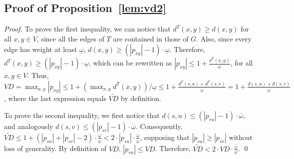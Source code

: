 \documentclass[english]{llncs}
\newcommand{\vd}{$\mathit{VD}$\xspace}
\newcommand{\vda}{$\tilde{\mathit{VD}}$\xspace}
\begin{document}
\subsection{Proof of Proposition~\ref{lem:vd2}}
\label{sub:proof_vd2}
\begin{proof}
To prove the first inequality, we can notice that $d^T(x,y) \geq d(x,y)$ for all $x,y \in V$, since all the edges of $T$ are contained in those of $G$. Also, since every edge has weight at least $\underline{\omega}$, $d(x,y) \geq (|p_{xy}|-1)\cdot \underline{\omega}$. Therefore, $d^T(x,y) \geq (|p_{xy}|-1)\cdot \underline{\omega}$, which can be rewritten as $|p_{xy}| \leq 1+ \frac{d^T(x,y)}{\underline{\omega}}$, for all $x,y \in V$. Thus, $\mathit{VD} = \max_{x,y} |p_{xy}| \leq 1+(\max_{x,y} d^T(x,y))/ \underline{\omega} \leq 1 + \frac{d^T(s,u)+d^T(s,v)}{\underline{\omega}} = 1 + \frac{d(s,u)+d(s,v)}{\underline{\omega}}$, where the last expression equals \vda by definition.

To prove the second inequality, we first notice that $d(s,u) \leq (|p_{su}|-1)\cdot \overline{\omega}$,
 and analogously $d(s,v) \leq (|p_{sv}|-1)\cdot \overline{\omega}$. Consequently, $\tilde{\mathit{VD}} \leq 1+(|p_{su}| + |p_{sv}|-2)\cdot \frac{\overline{\omega}}{\underline{\omega}} < 2 \cdot |p_{su}|\cdot \frac{\overline{\omega}}{\underline{\omega}}$, supposing that $|p_{su}| \geq |p_{sv}|$ without loss of generality. By definition of \vd, $|p_{su}| \leq \mathit{VD}$. Therefore, $\tilde{\mathit{VD}} < 2 \cdot \mathit{VD} \cdot \frac{\overline{\omega}}{\underline{\omega}}$.
 \qed
\end{proof}
\end{document}
